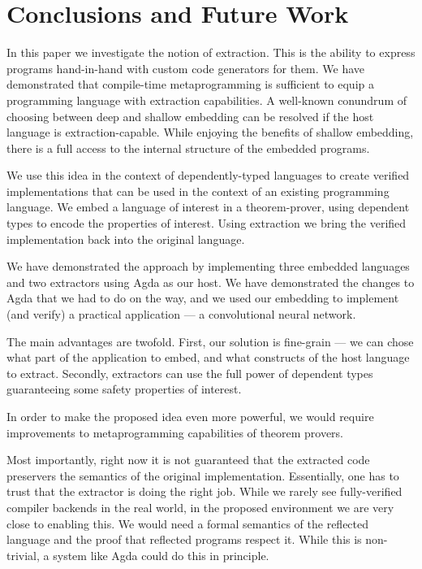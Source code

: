 \section{\label{sec:concl}Conclusions and Future Work}


In this paper we investigate the notion of extraction.  This
is the ability to express programs hand-in-hand with custom
code generators for them.  We have demonstrated that
compile-time metaprogramming is sufficient to equip
a programming language with extraction capabilities.
A well-known conundrum of choosing between deep and
shallow embedding can be resolved if the host language
is extraction-capable.  While enjoying the benefits
of shallow embedding, there is a full access to the internal
structure of the embedded programs.

We use this idea in the context of dependently-typed
languages to create verified implementations that can
be used in the context of an existing programming language.
We embed a language of interest in a theorem-prover, using
dependent types to encode the properties of interest.
Using extraction we bring the verified implementation
back into the original language.

We have demonstrated the approach by implementing
three embedded languages and two extractors using
Agda as our host.  We have demonstrated the
changes to Agda that we had to do on the way, and we
used our embedding to implement (and verify) a practical
application --- a convolutional neural network.

The main advantages are twofold.  First,
our solution is fine-grain --- we can chose what part
of the application to embed, and what constructs of the
host language to extract.  Secondly, extractors
can use the full power of dependent types guaranteeing
some safety properties of interest.

In order to make the proposed idea even more powerful,
we would require improvements to metaprogramming capabilities
of theorem provers.

Most importantly, right now it is not guaranteed that the
extracted code preservers the semantics of the original
implementation.  Essentially, one has to trust that the
extractor is doing the right job.  While we rarely see
fully-verified compiler backends in the real world, in
the proposed environment we are very close to enabling this.
We would need a formal semantics of the reflected language
and the proof that reflected programs respect it.
While this is non-trivial, a system like Agda could do
this in principle.

